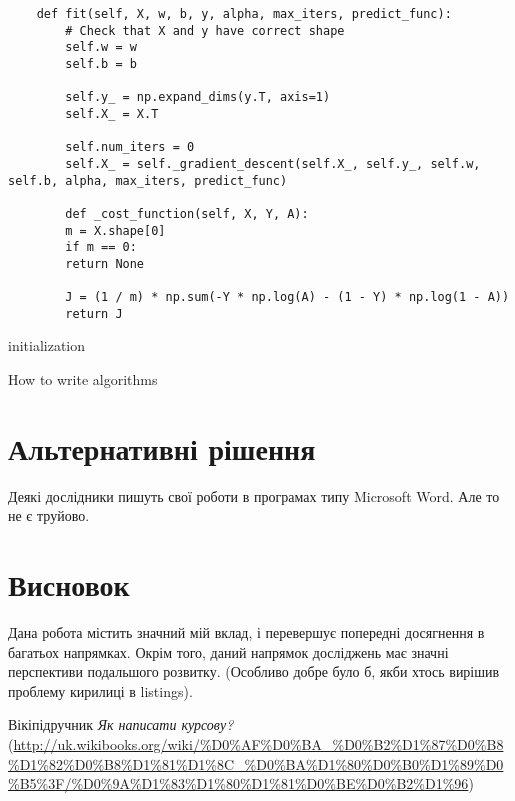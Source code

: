 \documentclass[a4paper,14pt]{extreport}
\begin{document}
	\lstset{language=Python}
	\begin{lstlisting}
	def fit(self, X, w, b, y, alpha, max_iters, predict_func):
		# Check that X and y have correct shape
		self.w = w
		self.b = b
		
		self.y_ = np.expand_dims(y.T, axis=1)
		self.X_ = X.T
		
		self.num_iters = 0
		self.X_ = self._gradient_descent(self.X_, self.y_, self.w, self.b, alpha, max_iters, predict_func)
		
		def _cost_function(self, X, Y, A):
		m = X.shape[0]
		if m == 0:
		return None
		
		J = (1 / m) * np.sum(-Y * np.log(A) - (1 - Y) * np.log(1 - A))
		return J
	\end{lstlisting}
	
	\begin{algorithm}[H]
		\SetAlgoLined
		initialization\;
		\caption{How to write algorithms}
	\end{algorithm}
	
	
	
	\chapter{Альтернативні рішення} 
	Деякі дослідники пишуть свої роботи в програмах типу Microsoft Word. Але то не є труйово\cite{howto}.
	
	
	\chapter{Висновок} 
	Дана робота містить значний мій вклад, і перевершує попередні досягнення в багатьох напрямках. Окрім того, даний напрямок досліджень має значні перспективи
	подальшого розвитку. (Особливо добре було б, якби хтось вирішив проблему кирилиці в listings).
	
	
	\newpage
	\begin{thebibliography}{9}
		
		 Вікіпідручник \emph{Як написати курсову?}
		(\url{http://uk.wikibooks.org/wiki/%D0%AF%D0%BA_%D0%B2%D1%87%D0%B8%D1%82%D0%B8%D1%81%D1%8C_%D0%BA%D1%80%D0%B0%D1%89%D0%B5%3F/%D0%9A%D1%83%D1%80%D1%81%D0%BE%D0%B2%D1%96})
			
		\end{thebibliography}
	
\end{document}
